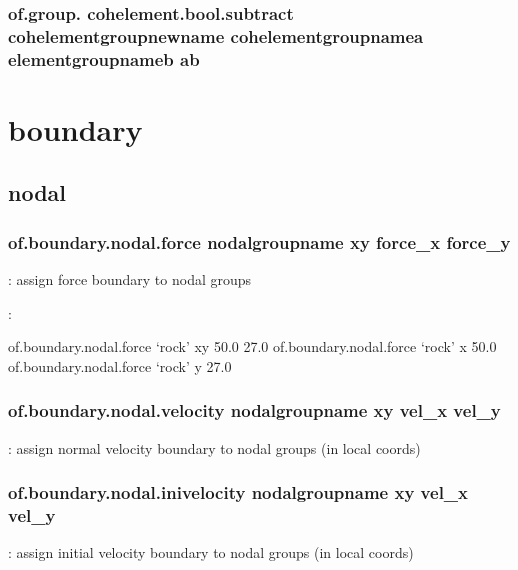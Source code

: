 \documentclass[letterpaper,10pt,english]{sphinxmanual}
\begin{document}
\subsection{of.group. cohelement.bool.subtract cohelementgroupnewname cohelementgroupnamea elementgroupnameb a\sphinxhyphen{}b}
\label{\detokenize{rst_tutorials/command_line_guide:of-group-cohelement-bool-subtract-cohelementgroupnewname-cohelementgroupnamea-elementgroupnameb-a-b}}\label{\detokenize{rst_tutorials/command_line_guide:section-9}}

\chapter{boundary}
\label{\detokenize{rst_tutorials/command_line_guide:boundary}}

\section{nodal}
\label{\detokenize{rst_tutorials/command_line_guide:nodal-1}}\label{\detokenize{rst_tutorials/command_line_guide:id2}}

\subsection{of.boundary.nodal.force nodalgroupname xy force\_x force\_y}
\label{\detokenize{rst_tutorials/command_line_guide:of-boundary-nodal-force-nodalgroupname-xy-force-x-force-y}}
: assign force boundary to nodal groups

:

\begin{sphinxVerbatim}[commandchars=\\\{\}]
of.boundary.nodal.force ‘rock’ xy \PYGZhy{}50.0 27.0
of.boundary.nodal.force ‘rock’ x \PYGZhy{}50.0
of.boundary.nodal.force ‘rock’ y 27.0
\end{sphinxVerbatim}


\subsection{of.boundary.nodal.velocity nodalgroupname xy vel\_x vel\_y}
\label{\detokenize{rst_tutorials/command_line_guide:of-boundary-nodal-velocity-nodalgroupname-xy-vel-x-vel-y}}
: assign normal velocity boundary to nodal groups (in local
coords)


\subsection{of.boundary.nodal.inivelocity nodalgroupname xy vel\_x vel\_y}
\label{\detokenize{rst_tutorials/command_line_guide:of-boundary-nodal-inivelocity-nodalgroupname-xy-vel-x-vel-y}}
: assign initial velocity boundary to nodal groups (in local
coords)
\end{document}
